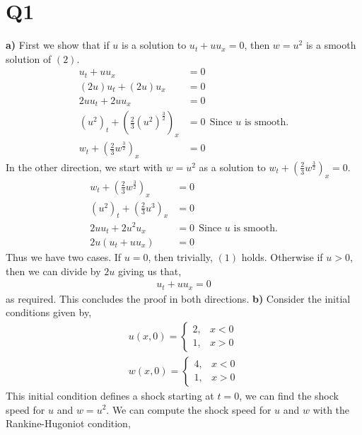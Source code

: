 \pagebreak

\section*{Q1}
\begin{solution}[\textbf{2}]
\hfill\break
\textbf{a)} First we show that if $u$ is a solution to $u_t +  uu_x = 0$, then $w = u^2$ is a smooth solution of $(2)$. 
\begin{align*}
    u_t + uu_x &= 0 \\
    (2u)u_t + (2u)u_x &= 0 \\
    2uu_t + 2uu_x &= 0 \\
    \left(u^2\right)_t + \left(\frac{2}{3} (u^2)^{\frac{3}{2}}\right)_x &= 0 \ \ \text{Since $u$ is smooth.} \\
    w_t + \left(\frac{2}{3} w ^{\frac{3}{2}}    \right)_x &= 0
\end{align*}
In the other direction, we start with $w = u^2$ as a solution to $w_t + \left(\frac{2}{3}w^{\frac{3}{2}}\right)_x  = 0$.
\begin{align*}
    w_t + \left(\frac{2}{3}w^{\frac{3}{2}}\right)_x &= 0 \\
    (u^2)_t + \left(\frac{2}{3}u^{3}\right)_x &= 0 \\
    2uu_t + 2u^2u_x &= 0 \ \ \text{Since $u$ is smooth.} \\
    2u(u_t + uu_x) &= 0
\end{align*}
Thus we have two cases. If $u = 0$, then trivially, $(1)$ holds. Otherwise if $u > 0$, then we can divide by $2u$ giving us that,
\begin{align*}
u_t + uu_x = 0
\end{align*}
as required. This concludes the proof in both directions.
\hfill\break
\hfill\break
\textbf{b)} \quad Consider the initial conditions given by,
\begin{align*}
    u(x,0) = \begin{cases} 2, & x < 0 \\ 1, & x > 0\end{cases} \\
    w(x,0) = \begin{cases} 4, & x < 0 \\ 1, & x > 0\end{cases}
\end{align*}
This initial condition defines a shock starting at $t = 0$, we can find the shock speed for $u$ and $w = u^2$. We can compute the shock speed for $u$ and $w$ with the Rankine-Hugoniot condition,

\end{solution}
